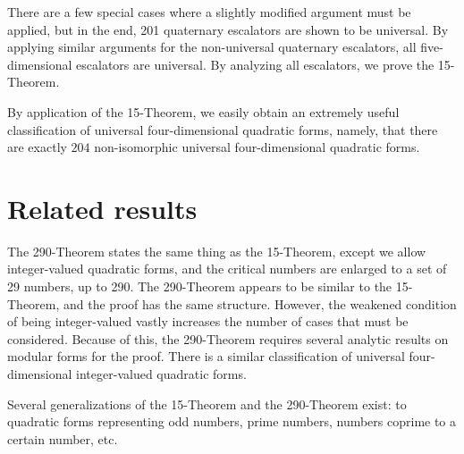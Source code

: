 \documentclass[letterpaper, 12pt]{article}
\begin{document}
There are a few special cases where a slightly modified argument must be applied, but in the end, 201 quaternary escalators are shown to be universal. By applying similar arguments for the non-universal quaternary escalators, all five-dimensional escalators are universal. By analyzing all escalators, we prove the 15-Theorem.

By application of the 15-Theorem, we easily obtain an extremely useful classification of universal four-dimensional quadratic forms, namely, that there are exactly $204$ non-isomorphic universal four-dimensional quadratic forms.

\section{Related results}
The 290-Theorem states the same thing as the 15-Theorem, except we allow integer-valued quadratic forms, and the critical numbers are enlarged to a set of 29 numbers, up to 290.
The 290-Theorem appears to be similar to the 15-Theorem, and the proof has the same structure. However, the weakened condition of being integer-valued vastly increases the number of cases that must be considered. Because of this, the 290-Theorem requires several analytic results on modular forms for the proof.
There is a similar classification of universal four-dimensional integer-valued quadratic forms.

Several generalizations of the 15-Theorem and the 290-Theorem exist: to quadratic forms representing odd numbers, prime numbers, numbers coprime to a certain number, etc.
\end{document}
